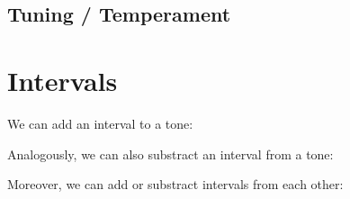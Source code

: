 \documentclass[letterpaper,10pt,english]{sphinxmanual}
\begin{document}
\subsection{Tuning / Temperament}
\label{\detokenize{2_fundamentals1:tuning-temperament}}

\section{Intervals}
\label{\detokenize{2_fundamentals1:intervals}}
We can add an interval to a tone:

\begin{sphinxVerbatim}[commandchars=\\\{\}]
    
   

   
   
   

  
\end{sphinxVerbatim}

Analogously, we can also substract an interval from a tone:

\begin{sphinxVerbatim}[commandchars=\\\{\}]
  
\end{sphinxVerbatim}

Moreover, we can add or substract intervals from each other:

\begin{sphinxVerbatim}[commandchars=\\\{\}]
    
  
\end{sphinxVerbatim}
\end{document}
